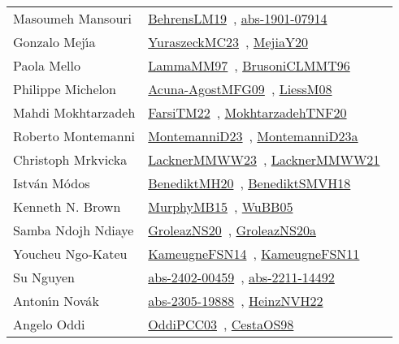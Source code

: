 {\begin{longtable}{p{4cm}p{20cm}}
Masoumeh Mansouri & \href{works/BehrensLM19.pdf}{BehrensLM19}~\cite{BehrensLM19}, \href{works/abs-1901-07914.pdf}{abs-1901-07914}~\cite{abs-1901-07914}\\
Gonzalo Mej{\'{\i}}a & \href{works/YuraszeckMC23.pdf}{YuraszeckMC23}~\cite{YuraszeckMC23}, \href{works/MejiaY20.pdf}{MejiaY20}~\cite{MejiaY20}\\
Paola Mello & \href{works/LammaMM97.pdf}{LammaMM97}~\cite{LammaMM97}, \href{works/BrusoniCLMMT96.pdf}{BrusoniCLMMT96}~\cite{BrusoniCLMMT96}\\
Philippe Michelon & \href{works/Acuna-AgostMFG09.pdf}{Acuna-AgostMFG09}~\cite{Acuna-AgostMFG09}, \href{works/LiessM08.pdf}{LiessM08}~\cite{LiessM08}\\
Mahdi Mokhtarzadeh & \href{works/FarsiTM22.pdf}{FarsiTM22}~\cite{FarsiTM22}, \href{works/MokhtarzadehTNF20.pdf}{MokhtarzadehTNF20}~\cite{MokhtarzadehTNF20}\\
Roberto Montemanni & \href{works/MontemanniD23.pdf}{MontemanniD23}~\cite{MontemanniD23}, \href{works/MontemanniD23a.pdf}{MontemanniD23a}~\cite{MontemanniD23a}\\
Christoph Mrkvicka & \href{works/LacknerMMWW23.pdf}{LacknerMMWW23}~\cite{LacknerMMWW23}, \href{works/LacknerMMWW21.pdf}{LacknerMMWW21}~\cite{LacknerMMWW21}\\
Istv{\'{a}}n M{\'{o}}dos & \href{works/BenediktMH20.pdf}{BenediktMH20}~\cite{BenediktMH20}, \href{works/BenediktSMVH18.pdf}{BenediktSMVH18}~\cite{BenediktSMVH18}\\
Kenneth N. Brown & \href{works/MurphyMB15.pdf}{MurphyMB15}~\cite{MurphyMB15}, \href{works/WuBB05.pdf}{WuBB05}~\cite{WuBB05}\\
Samba Ndojh Ndiaye & \href{works/GroleazNS20.pdf}{GroleazNS20}~\cite{GroleazNS20}, \href{works/GroleazNS20a.pdf}{GroleazNS20a}~\cite{GroleazNS20a}\\
Youcheu Ngo{-}Kateu & \href{works/KameugneFSN14.pdf}{KameugneFSN14}~\cite{KameugneFSN14}, \href{works/KameugneFSN11.pdf}{KameugneFSN11}~\cite{KameugneFSN11}\\
Su Nguyen & \href{works/abs-2402-00459.pdf}{abs-2402-00459}~\cite{abs-2402-00459}, \href{works/abs-2211-14492.pdf}{abs-2211-14492}~\cite{abs-2211-14492}\\
Anton{\'{\i}}n Nov{\'{a}}k & \href{works/abs-2305-19888.pdf}{abs-2305-19888}~\cite{abs-2305-19888}, \href{works/HeinzNVH22.pdf}{HeinzNVH22}~\cite{HeinzNVH22}\\
Angelo Oddi & \href{works/OddiPCC03.pdf}{OddiPCC03}~\cite{OddiPCC03}, \href{works/CestaOS98.pdf}{CestaOS98}~\cite{CestaOS98}\\

\end{longtable}}
